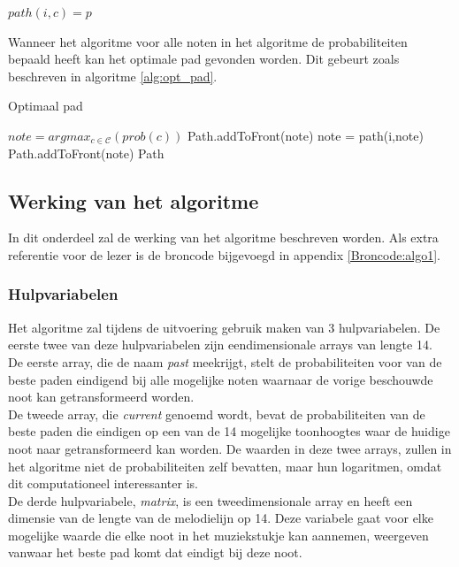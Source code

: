 \begin{framed}
\noindent
$path(i,c)=p$
\end{framed}

Wanneer het algoritme voor alle noten in het algoritme de probabiliteiten bepaald heeft kan het optimale pad gevonden worden. Dit gebeurt zoals beschreven in algoritme \ref{alg:opt_pad}.

\begin{algorithm}
\caption{Optimaal pad}\label{alg:opt_pad}
\begin{algorithmic}
\State $note=argmax_{c \in \mathcal{C}}(prob(c))$
\State Path.addToFront(note)
	\State note = path(i,note)
	\State Path.addToFront(note)
\EndFor
\State \Return Path
\end{algorithmic}
\end{algorithm}


\subsection{Werking van het algoritme}
In dit onderdeel zal de werking van het algoritme beschreven worden. Als extra referentie voor de lezer is de broncode bijgevoegd in appendix \ref{Broncode:algo1}.

\subsubsection{Hulpvariabelen}
Het algoritme zal tijdens de uitvoering gebruik maken van 3 hulpvariabelen. De eerste twee van deze hulpvariabelen zijn eendimensionale arrays van lengte 14.\\
De eerste array, die de naam \textit{past} meekrijgt, stelt de probabiliteiten voor van de beste paden eindigend bij alle mogelijke noten waarnaar de vorige beschouwde noot kan getransformeerd worden.\\ 
De tweede array, die \textit{current} genoemd wordt, bevat de probabiliteiten van de beste paden die eindigen op een van de 14 mogelijke toonhoogtes waar de huidige noot naar getransformeerd kan worden. De waarden in deze twee arrays, zullen in het algoritme niet de probabiliteiten zelf bevatten, maar hun logaritmen, omdat dit computationeel interessanter is.\\ 
De derde hulpvariabele, \textit{matrix}, is een tweedimensionale array en heeft een dimensie van de lengte van de melodielijn op 14. Deze variabele gaat voor elke mogelijke waarde die elke noot in het muziekstukje kan aannemen, weergeven vanwaar het beste pad komt dat eindigt bij deze noot.

